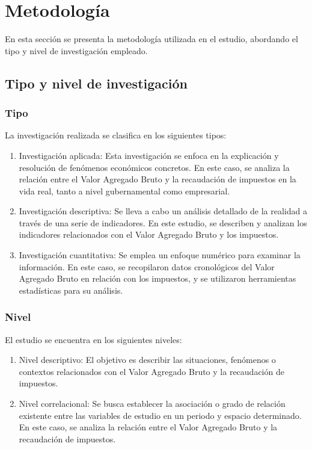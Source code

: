 \documentclass[
  jou,
  floatsintext,
  longtable,
  a4paper,
  nolmodern,
  notxfonts,
  notimes,
  12pt,
  colorlinks=true,linkcolor=blue,citecolor=blue,urlcolor=blue]{apa7}
\begin{document}
\section{Metodología}\label{sec-metodologuxeda}

En esta sección se presenta la metodología utilizada en el estudio,
abordando el tipo y nivel de investigación empleado.

\subsection{Tipo y nivel de
investigación}\label{tipo-y-nivel-de-investigaciuxf3n}

\subsubsection{Tipo}\label{tipo}

La investigación realizada se clasifica en los siguientes tipos:

\begin{enumerate}
\def\labelenumi{\alph{enumi}.}
\item
  Investigación aplicada: Esta investigación se enfoca en la explicación
  y resolución de fenómenos económicos concretos. En este caso, se
  analiza la relación entre el Valor Agregado Bruto y la recaudación de
  impuestos en la vida real, tanto a nivel gubernamental como
  empresarial.
\item
  Investigación descriptiva: Se lleva a cabo un análisis detallado de la
  realidad a través de una serie de indicadores. En este estudio, se
  describen y analizan los indicadores relacionados con el Valor
  Agregado Bruto y los impuestos.
\item
  Investigación cuantitativa: Se emplea un enfoque numérico para
  examinar la información. En este caso, se recopilaron datos
  cronológicos del Valor Agregado Bruto en relación con los impuestos, y
  se utilizaron herramientas estadísticas para su análisis.
\end{enumerate}

\subsubsection{Nivel}\label{nivel}

El estudio se encuentra en los siguientes niveles:

\begin{enumerate}
\def\labelenumi{\alph{enumi}.}
\item
  Nivel descriptivo: El objetivo es describir las situaciones, fenómenos
  o contextos relacionados con el Valor Agregado Bruto y la recaudación
  de impuestos.
\item
  Nivel correlacional: Se busca establecer la asociación o grado de
  relación existente entre las variables de estudio en un periodo y
  espacio determinado. En este caso, se analiza la relación entre el
  Valor Agregado Bruto y la recaudación de impuestos.
\end{enumerate}
\end{document}
